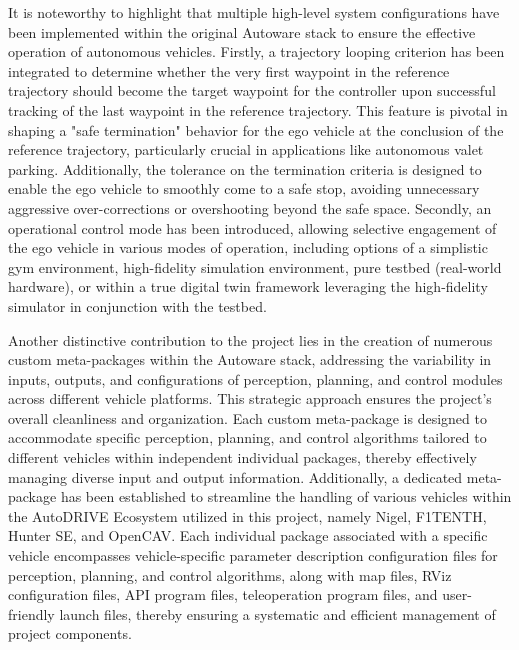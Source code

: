 It is noteworthy to highlight that multiple high-level system configurations have been implemented within the original Autoware stack to ensure the effective operation of autonomous vehicles. Firstly, a trajectory looping criterion has been integrated to determine whether the very first waypoint in the reference trajectory should become the target waypoint for the controller upon successful tracking of the last waypoint in the reference trajectory. This feature is pivotal in shaping a "safe termination" behavior for the ego vehicle at the conclusion of the reference trajectory, particularly crucial in applications like autonomous valet parking. Additionally, the tolerance on the termination criteria is designed to enable the ego vehicle to smoothly come to a safe stop, avoiding unnecessary aggressive over-corrections or overshooting beyond the safe space. Secondly, an operational control mode has been introduced, allowing selective engagement of the ego vehicle in various modes of operation, including options of a simplistic gym environment, high-fidelity simulation environment, pure testbed (real-world hardware), or within a true digital twin framework leveraging the high-fidelity simulator in conjunction with the testbed.

Another distinctive contribution to the project lies in the creation of numerous custom meta-packages within the Autoware stack, addressing the variability in inputs, outputs, and configurations of perception, planning, and control modules across different vehicle platforms. This strategic approach ensures the project's overall cleanliness and organization. Each custom meta-package is designed to accommodate specific perception, planning, and control algorithms tailored to different vehicles within independent individual packages, thereby effectively managing diverse input and output information. Additionally, a dedicated meta-package has been established to streamline the handling of various vehicles within the AutoDRIVE Ecosystem utilized in this project, namely Nigel, F1TENTH, Hunter SE, and OpenCAV. Each individual package associated with a specific vehicle encompasses vehicle-specific parameter description configuration files for perception, planning, and control algorithms, along with map files, RViz configuration files, API program files, teleoperation program files, and user-friendly launch files, thereby ensuring a systematic and efficient management of project components.

